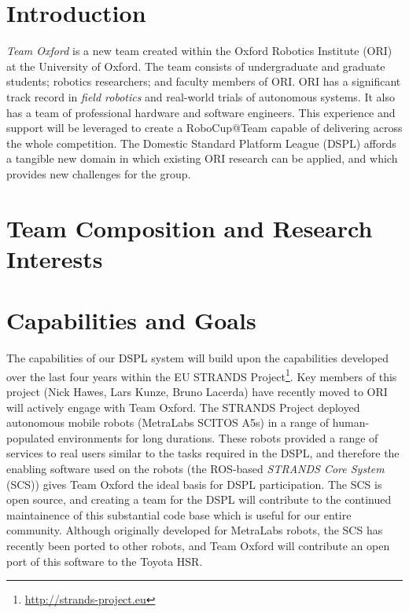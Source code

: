 \documentclass[runningheads,a4paper]{llncs}
\newcommand{\teamori}{Team Oxford}
\begin{document}

\section{Introduction}

\textit{\teamori{}} is a new team created within the Oxford Robotics Institute
(ORI) at the University of Oxford. The team consists of undergraduate and graduate students; robotics researchers; and faculty members of ORI. ORI has a significant track record in \emph{field robotics} and real-world trials of autonomous systems. It also has a team of professional hardware and software engineers. This experience and support will be leveraged to create a RoboCup@Team capable of delivering across the whole competition. The Domestic Standard Platform League (DSPL) affords a tangible new domain in which existing ORI research can be applied, and which provides new challenges for the group. 


\section{Team Composition and Research Interests}

\section{Capabilities and Goals}


The capabilities of our DSPL system will build upon the capabilities developed over the last four years within the EU STRANDS Project\footnote{\url{http://strands-project.eu}}. Key members of this project (Nick Hawes, Lars Kunze, Bruno Lacerda) have recently moved to ORI will actively engage with \teamori. The STRANDS Project deployed autonomous mobile robots (MetraLabs SCITOS A5s) in a range of human-populated environments for long durations\cite{strands@ram}. These robots provided a range of services to real users similar to the tasks required in the DSPL, and therefore the enabling software used on the robots (the ROS-based \emph{STRANDS Core System} (SCS)) gives \teamori{} the ideal basis for DSPL participation. The SCS is open source, and creating a team for the DSPL will contribute to the continued maintainence of this substantial code base which is useful for our entire community. Although originally developed for MetraLabs robots, the SCS has recently been ported to other robots, and \teamori{} will contribute an open port of this software to the Toyota HSR. 
\end{document}
